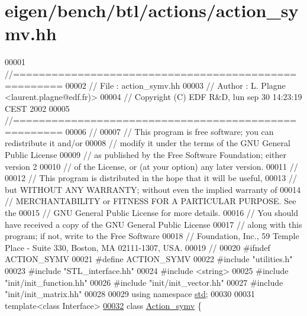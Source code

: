 \hypertarget{eigen_2bench_2btl_2actions_2action__symv_8hh_source}{}\section{eigen/bench/btl/actions/action\+\_\+symv.hh}
\label{eigen_2bench_2btl_2actions_2action__symv_8hh_source}

\begin{DoxyCode}
00001 \textcolor{comment}{//=====================================================}
00002 \textcolor{comment}{// File   :  action\_symv.hh}
00003 \textcolor{comment}{// Author :  L. Plagne <laurent.plagne@edf.fr)>}
00004 \textcolor{comment}{// Copyright (C) EDF R&D,  lun sep 30 14:23:19 CEST 2002}
00005 \textcolor{comment}{//=====================================================}
00006 \textcolor{comment}{//}
00007 \textcolor{comment}{// This program is free software; you can redistribute it and/or}
00008 \textcolor{comment}{// modify it under the terms of the GNU General Public License}
00009 \textcolor{comment}{// as published by the Free Software Foundation; either version 2}
00010 \textcolor{comment}{// of the License, or (at your option) any later version.}
00011 \textcolor{comment}{//}
00012 \textcolor{comment}{// This program is distributed in the hope that it will be useful,}
00013 \textcolor{comment}{// but WITHOUT ANY WARRANTY; without even the implied warranty of}
00014 \textcolor{comment}{// MERCHANTABILITY or FITNESS FOR A PARTICULAR PURPOSE.  See the}
00015 \textcolor{comment}{// GNU General Public License for more details.}
00016 \textcolor{comment}{// You should have received a copy of the GNU General Public License}
00017 \textcolor{comment}{// along with this program; if not, write to the Free Software}
00018 \textcolor{comment}{// Foundation, Inc., 59 Temple Place - Suite 330, Boston, MA  02111-1307, USA.}
00019 \textcolor{comment}{//}
00020 \textcolor{preprocessor}{#ifndef ACTION\_SYMV}
00021 \textcolor{preprocessor}{#define ACTION\_SYMV}
00022 \textcolor{preprocessor}{#include "utilities.h"}
00023 \textcolor{preprocessor}{#include "STL\_interface.hh"}
00024 \textcolor{preprocessor}{#include <string>}
00025 \textcolor{preprocessor}{#include "init/init\_function.hh"}
00026 \textcolor{preprocessor}{#include "init/init\_vector.hh"}
00027 \textcolor{preprocessor}{#include "init/init\_matrix.hh"}
00028 
00029 \textcolor{keyword}{using namespace }\hyperlink{namespacestd}{std};
00030 
00031 \textcolor{keyword}{template}<\textcolor{keyword}{class} Interface>
\hyperlink{class_action__symv}{00032} \textcolor{keyword}{class }\hyperlink{class_action__symv}{Action\_symv} \{

\end{DoxyCode}
